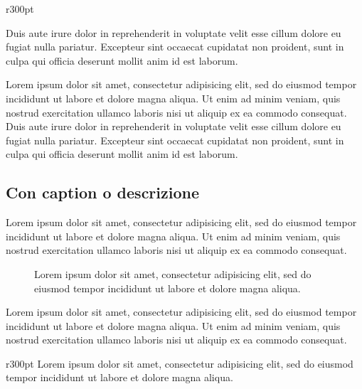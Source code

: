 \documentclass[a4paper, 12pt]{report}
\begin{document}
\begin{wrapfigure}{r}{300pt}
	\centering
	\vspace{-1.5\baselineskip}
	\vspace{-2.5\baselineskip}
\end{wrapfigure}

Duis aute irure dolor in reprehenderit in voluptate velit esse
cillum dolore eu fugiat nulla pariatur. Excepteur sint occaecat cupidatat non
proident, sunt in culpa qui officia deserunt mollit anim id est laborum.

Lorem ipsum dolor sit amet, consectetur adipisicing elit, sed do eiusmod
tempor incididunt ut labore et dolore magna aliqua. Ut enim ad minim veniam,
quis nostrud exercitation ullamco laboris nisi ut aliquip ex ea commodo
consequat. Duis aute irure dolor in reprehenderit in voluptate velit esse
cillum dolore eu fugiat nulla pariatur. Excepteur sint occaecat cupidatat non
proident, sunt in culpa qui officia deserunt mollit anim id est laborum.

\subsection*{Con caption o descrizione}

Lorem ipsum dolor sit amet, consectetur adipisicing elit, sed do eiusmod
tempor incididunt ut labore et dolore magna aliqua. Ut enim ad minim veniam,
quis nostrud exercitation ullamco laboris nisi ut aliquip ex ea commodo consequat.

\begin{figure}[h]
	\centering
	\caption{
		Lorem ipsum dolor sit amet, consectetur adipisicing elit, sed do eiusmod
		tempor incididunt ut labore et dolore magna aliqua.
	}
\end{figure}

Lorem ipsum dolor sit amet, consectetur adipisicing elit, sed do eiusmod
tempor incididunt ut labore et dolore magna aliqua. Ut enim ad minim veniam,
quis nostrud exercitation ullamco laboris nisi ut aliquip ex ea commodo consequat.

\begin{wrapfigure}{r}{300pt}
	\centering
	\vspace{-1.5\baselineskip}
	{\footnotesize
		Lorem ipsum dolor sit amet, consectetur adipisicing elit, sed do eiusmod
		tempor incididunt ut labore et dolore magna aliqua.
	}
	\vspace{-1\baselineskip}
\end{wrapfigure}
\end{document}

